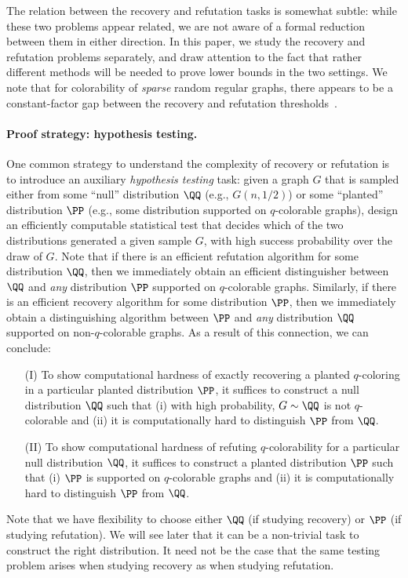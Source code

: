 \documentclass{article}
\begin{document}
The relation between the recovery and refutation tasks is somewhat subtle: while these two problems appear related, we are not aware of a formal reduction between them in either direction. In this paper, we study the recovery and refutation problems separately, and draw attention to the fact that rather different methods will be needed to prove lower bounds in the two settings. We note that for colorability of \emph{sparse} random regular graphs, there appears to be a constant-factor gap between the recovery and refutation thresholds~\cite{spectral-planting}.

\paragraph{Proof strategy: hypothesis testing.}

One common strategy to understand the complexity of recovery or refutation is to introduce an auxiliary \emph{hypothesis testing} task: given a graph $G$ that is sampled either from some ``null'' distribution $\QQ$ (e.g., $G(n,1/2)$) or some ``planted'' distribution $\PP$ (e.g., some distribution supported on $q$-colorable graphs), design an efficiently computable statistical test that decides which of the two distributions generated a given sample $G$, with high success probability over the draw of $G$. Note that if there is an efficient refutation algorithm for some distribution $\QQ$, then we immediately obtain an efficient distinguisher between $\QQ$ and \emph{any} distribution $\PP$ supported on $q$-colorable graphs. Similarly, if there is an efficient recovery algorithm for some distribution $\PP$, then we immediately obtain a distinguishing algorithm between $\PP$ and \emph{any} distribution $\QQ$ supported on non-$q$-colorable graphs. As a result of this connection, we can conclude: 
\begin{itemize}
    \item [(I)] To show computational hardness of exactly recovering a planted $q$-coloring in a particular planted distribution $\PP$, it suffices to construct a null distribution $\QQ$ such that (i) with high probability, $G \sim \QQ$ is not $q$-colorable and (ii) it is computationally hard to distinguish $\PP$ from $\QQ$.
    \item [(II)] To show computational hardness of refuting $q$-colorability for a particular null distribution $\QQ$, it suffices to construct a planted distribution $\PP$ such that (i) $\PP$ is supported on $q$-colorable graphs and (ii) it is computationally hard to distinguish $\PP$ from $\QQ$.
\end{itemize}
Note that we have flexibility to choose either $\QQ$ (if studying recovery) or $\PP$ (if studying refutation). We will see later that it can be a non-trivial task to construct the right distribution. It need not be the case that the same testing problem arises when studying recovery as when studying refutation.
\end{document}
